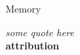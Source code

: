 



\begin{center}
\vspace*{\fill}
\Huge{Memory}

\vspace{2cm}

\begin{flushright}
\large{
\textit{ some quote here}\\
\textbf{ attribution }}
\end{flushright}

\vspace*{\fill}
\end{center}
